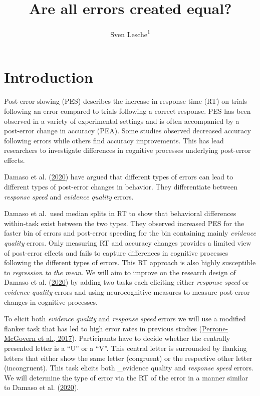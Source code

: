 \documentclass[
  man,floatsintext]{apa7}
\title{Are all errors created equal?}
\author{Sven Lesche\textsuperscript{1}}
\date{}
\affiliation{\vspace{0.5cm}\textsuperscript{1} Ruprecht-Karls-University Heidelberg}
\begin{document}
\maketitle

\hypertarget{introduction}{%
\section{Introduction}\label{introduction}}

Post-error slowing (PES) describes the increase in response time (RT) on trials following an error compared to trials following a correct response. PES has been observed in a variety of experimental settings and is often accompanied by a post-error change in accuracy (PEA). Some studies observed decreased accuracy following errors while others find accuracy improvements. This has lead researchers to investigate differences in cognitive processes underlying post-error effects.

Damaso et al. (\protect\hyperlink{ref-damaso2020}{2020}) have argued that different types of errors can lead to different types of post-error changes in behavior. They differentiate between \emph{response speed} and \emph{evidence quality} errors.

Damaso et al.~used median splits in RT to show that behavioral differences within-task exist between the two types. They observed increased PES for the faster bin of errors and post-error speeding for the bin containing mainly \emph{evidence quality} errors. Only measuring RT and accuracy changes provides a limited view of post-error effects and fails to capture differences in cognitive processes following the different types of errors. This RT approach is also highly susceptible to \emph{regression to the mean}. We will aim to improve on the research design of Damaso et al. (\protect\hyperlink{ref-damaso2020}{2020}) by adding two tasks each eliciting either \emph{response speed} or \emph{evidence quality} errors and using neurocognitive measures to measure post-error changes in cognitive processes.

To elicit both \emph{evidence quality} and \emph{response speed} errors we will use a modified flanker task that has led to high error rates in previous studies (\protect\hyperlink{ref-perrone2017influence}{Perrone-McGovern et al., 2017}). Participants have to decide whether the centrally presented letter is a ``U'' or a ``V''. This central letter is surrounded by flanking letters that either show the same letter (congruent) or the respective other letter (incongruent). This task elicits both \_evidence quality and \emph{response speed} errors. We will determine the type of error via the RT of the error in a manner similar to Damaso et al. (\protect\hyperlink{ref-damaso2020}{2020}).
\end{document}
